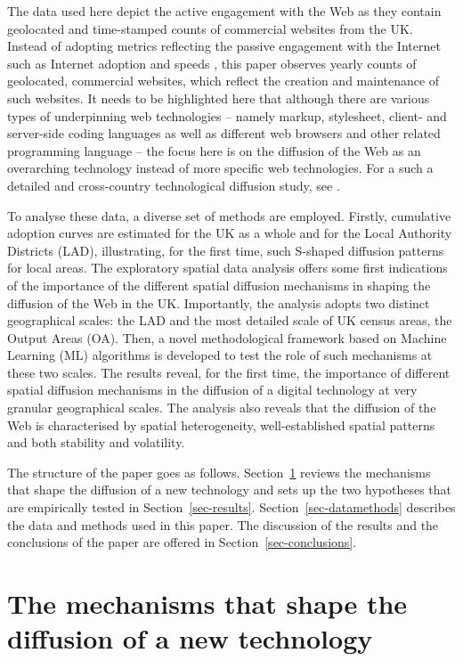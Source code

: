 \documentclass[
  authoryear,
  preprint,
  3p]{elsarticle}
\begin{document}
The data used here depict the active engagement with the Web as they
contain geolocated and time-stamped counts of commercial websites from
the UK. Instead of adopting metrics reflecting the passive engagement
with the Internet such as Internet adoption and speeds
\citep[e.g.][]{blank2018local, destefano2022fuzzy}, this paper observes
yearly counts of geolocated, commercial websites, which reflect the
creation and maintenance of such websites. It needs to be highlighted
here that although there are various types of underpinning web
technologies -- namely markup, stylesheet, client- and server-side
coding languages as well as different web browsers and other related
programming language -- the focus here is on the diffusion of the Web as
an overarching technology instead of more specific web technologies. For
a such a detailed and cross-country technological diffusion study, see
\citet{PAPAGIANNIDIS2015308}.

To analyse these data, a diverse set of methods are employed. Firstly,
cumulative adoption curves are estimated for the UK as a whole and for
the Local Authority Districts (LAD), illustrating, for the first time,
such S-shaped diffusion patterns for local areas. The exploratory
spatial data analysis offers some first indications of the importance of
the different spatial diffusion mechanisms in shaping the diffusion of
the Web in the UK. Importantly, the analysis adopts two distinct
geographical scales: the LAD and the most detailed scale of UK census
areas, the Output Areas (OA). Then, a novel methodological framework
based on Machine Learning (ML) algorithms is developed to test the role
of such mechanisms at these two scales. The results reveal, for the
first time, the importance of different spatial diffusion mechanisms in
the diffusion of a digital technology at very granular geographical
scales. The analysis also reveals that the diffusion of the Web is
characterised by spatial heterogeneity, well-established spatial
patterns and both stability and volatility.

The structure of the paper goes as follows. Section~\ref{sec-litreview}
reviews the mechanisms that shape the diffusion of a new technology and
sets up the two hypotheses that are empirically tested in
Section~\ref{sec-results}. Section~\ref{sec-datamethods} describes the
data and methods used in this paper. The discussion of the results and
the conclusions of the paper are offered in
Section~\ref{sec-conclusions}.

\section{The mechanisms that shape the diffusion of a new
technology}\label{sec-litreview}
\end{document}
